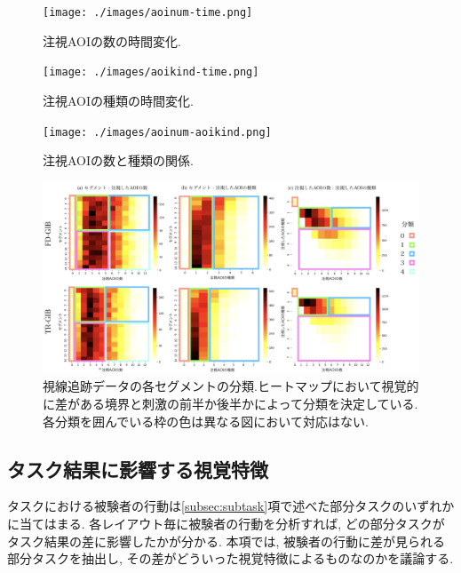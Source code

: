 \documentclass{kuee}
\begin{document}
\begin{figure}[t]
  \begin{center}
  \texttt{[image: ./images/aoinum-time.png]}
  \caption{注視AOIの数の時間変化. \label{fig:AOI_number-time}}
  \end{center}
\end{figure}

\begin{figure}[t]
  \begin{center}
  \texttt{[image: ./images/aoikind-time.png]}
  \caption{注視AOIの種類の時間変化. \label{fig:AOI_kind-time}}
  \end{center}
\end{figure}

\begin{figure}[t]
  \begin{center}
  \texttt{[image: ./images/aoinum-aoikind.png]}
  \caption{注視AOIの数と種類の関係. \label{fig:AOI_number-AOI_kind}}
  \end{center}
\end{figure}

\begin{figure}[t]
  \begin{center}
  \includegraphics[width=15cm]{./images/taxonomy.png}
  \caption{視線追跡データの各セグメントの分類.ヒートマップにおいて視覚的に差がある境界と刺激の前半か後半かによって分類を決定している.各分類を囲んでいる枠の色は異なる図において対応はない. \label{fig:taxonomy}}
  \end{center}
\end{figure}


\subsection{タスク結果に影響する視覚特徴}
タスクにおける被験者の行動は\ref{subsec:subtask}項で述べた部分タスクのいずれかに当てはまる.
各レイアウト毎に被験者の行動を分析すれば, どの部分タスクがタスク結果の差に影響したかが分かる.
本項では, 被験者の行動に差が見られる部分タスクを抽出し, その差がどういった視覚特徴によるものなのかを議論する.
\end{document}
